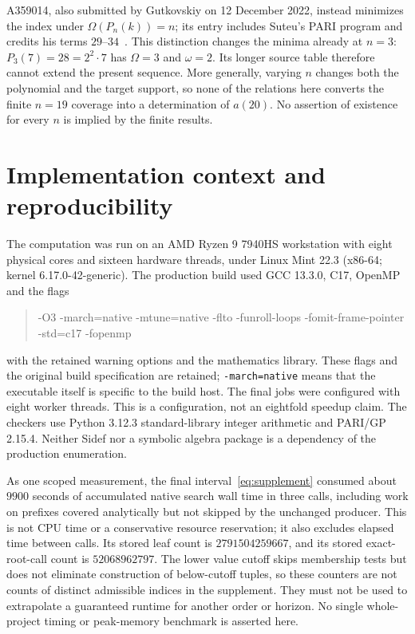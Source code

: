\documentclass[11pt]{article}
\theoremstyle{remark}
\begin{document}
A359014, also submitted by Gutkovskiy on 12 December 2022, instead minimizes
the index under $\Omega(P_n(k))=n$; its entry includes Suteu's PARI program
and credits his terms $29$--$34$~\cite{oeis014}. This distinction changes
the minima already at $n=3$: $P_3(7)=28=2^2\cdot7$ has $\Omega=3$ and
$\omega=2$. Its longer source table therefore cannot extend the present
sequence. More generally, varying $n$ changes both the polynomial and the
target support, so none of the relations here converts the finite $n=19$
coverage into a determination of $a(20)$. No assertion of existence for
every $n$ is implied by the finite results.

\section{Implementation context and reproducibility}\label{sec:repro}
The computation was run on an AMD Ryzen 9 7940HS workstation with eight
physical cores and sixteen hardware threads, under Linux Mint 22.3
(x86-64; kernel 6.17.0-42-generic). The production build used GCC 13.3.0,
C17, OpenMP and the flags
\begin{quote}\small\ttfamily\raggedright
-O3 -march=native -mtune=native -flto -funroll-loops
-fomit-frame-pointer -std=c17 -fopenmp
\end{quote}
with the retained warning options and the mathematics library. These flags
and the original build specification are retained; \texttt{-march=native}
means that the executable itself is specific to the build host. The final
jobs were configured with eight worker threads. This is a configuration,
not an eightfold speedup claim. The checkers use Python 3.12.3 standard-library
integer arithmetic and PARI/GP 2.15.4. Neither Sidef nor a symbolic algebra
package is a dependency of the production enumeration.

As one scoped measurement, the final interval~\eqref{eq:supplement} consumed
about $9900$ seconds of accumulated native search wall time in three calls,
including work on prefixes covered analytically but not skipped by
the unchanged producer. This is not
CPU time or a conservative resource reservation; it also excludes elapsed
time between calls. Its stored leaf count is $2791504259667$, and its
stored exact-root-call count is $52068962797$. The lower value cutoff skips
membership tests but does not eliminate construction of below-cutoff tuples,
so these counters are not counts of distinct admissible indices in the
supplement. They must not be used to extrapolate a guaranteed runtime for
another order or horizon. No single whole-project timing or peak-memory
benchmark is asserted here.
\end{document}
